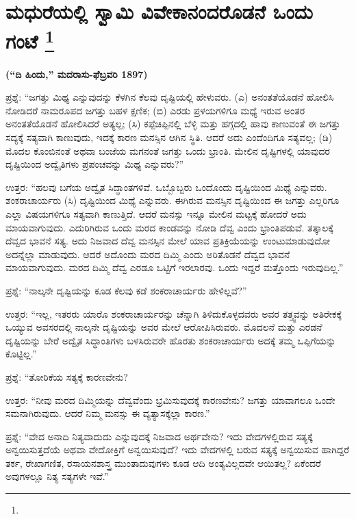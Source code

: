 
\chapter[ಮಧುರೆಯಲ್ಲಿ ಸ್ವಾಮಿ ವಿವೇಕಾನಂದರೊಡನೆ ಒಂದು ಗಂಟೆ ]{ಮಧುರೆಯಲ್ಲಿ ಸ್ವಾಮಿ ವಿವೇಕಾನಂದರೊಡನೆ ಒಂದು ಗಂಟೆ \protect\footnote{}}

\centerline{\textbf{(“ದಿ ಹಿಂದು,” ಮದರಾಸು-ಫೆಬ್ರವರಿ 1897)}}

ಪ್ರಶ್ನೆ: “ಜಗತ್ತು ಮಿಥ್ಯ ಎನ್ನುವುದನ್ನು ಕೆಳಗಿನ ಕೆಲವು ದೃಷ್ಟಿಯಲ್ಲಿ ಹೇಳುವರು. (ಎ) ಅನಂತತೆಯೊಡನೆ ಹೋಲಿಸಿ ನೋಡಿದರೆ ನಾಮರೂಪದ ಜಗತ್ತು ಬಹಳ ಕ್ಷಣಿಕ; (ಬಿ) ಎರಡು ಪ್ರಳಯಗಳಿಗೂ ಮಧ್ಯೆ ಇರುವ ಅಂತರ ಅನಂತತೆಯೊಡನೆ ಹೋಲಿಸಿದರೆ ಅತ್ಯಲ್ಪ; (ಸಿ) ಕಪ್ಪೆಚಿಪ್ಪಿನಲ್ಲಿ ಬೆಳ್ಳಿ ಮತ್ತು ಹಗ್ಗದಲ್ಲಿ ಹಾವು ಕಾಣುವಂತೆ ಈ ಜಗತ್ತು ಸದ್ಯಕ್ಕೆ ಸತ್ಯವಾಗಿ ಕಾಣುವುದು, ಇದಕ್ಕೆ ಕಾರಣ ಮನಸ್ಸಿನ ಆಗಿನ ಸ್ಥಿತಿ. ಆದರೆ ಅದು ಎಂದೆಂದಿಗೂ ಸತ್ಯವಲ್ಲ; (ಡಿ) ಮೊದಲ ಕೊಂಬಿನಂತೆ ಅಥವಾ ಬಂಜೆಯ ಮಗನಂತೆ ಜಗತ್ತು ಒಂದು ಭ್ರಾಂತಿ. ಮೇಲಿನ ದೃಷ್ಟಿಗಳಲ್ಲಿ ಯಾವುದರ ದೃಷ್ಟಿಯಿಂದ ಅದ್ವೈತಿಗಳು ಪ್ರಪಂಚವನ್ನು ಮಿಥ್ಯ ಎನ್ನುವರು?”

\vskip 3pt

ಉತ್ತರ: “ಹಲವು ಬಗೆಯ ಅದ್ವೈತ ಸಿದ್ಧಾಂತಗಳಿವೆ. ಒಬ್ಬೊಬ್ಬರು ಒಂದೊಂದು ದೃಷ್ಟಿಯಿಂದ ಮಿಥ್ಯೆ ಎನ್ನುವರು. ಶಂಕರಾಚಾರ್ಯರು (ಸಿ) ದೃಷ್ಟಿಯಿಂದ ಮಿಥ್ಯೆ ಎನ್ನುವರು. ಈಗಿರುವ ಮನಸ್ಸಿನ ದೃಷ್ಟಿಯಿಂದ ಈ ಜಗತ್ತು ಎಲ್ಲರಿಗೂ ಎಲ್ಲಾ ವಿಷಯಗಳಿಗೂ ಸತ್ಯವಾಗಿ ಕಾಣುತ್ತಿದೆ. ಆದರೆ ಮನಸ್ಸು ಇನ್ನೂ ಮೇಲಿನ ಮಟ್ಟಕ್ಕೆ ಹೋದರೆ ಅದು ಮಾಯವಾಗುವುದು. ಎದುರಿಗಿರುವ ಒಂದು ಮರದ ಕಾಂಡವನ್ನು ನೋಡಿ ದೆವ್ವ ಎಂದು ಭ್ರಾಂತಿಪಡುವೆ. ತತ್ಕಾಲಕ್ಕೆ ದೆವ್ವದ ಭಾವನೆ ಸತ್ಯ. ಅದು ನಿಜವಾದ ದೆವ್ವ ಮನಸ್ಸಿನ ಮೇಲೆ ಯಾವ ಪ್ರತಿಕ್ರಿಯೆಯನ್ನು ಉಂಟುಮಾಡುವುದೋ ಅದನ್ನೆಲ್ಲಾ ಮಾಡುವುದು. ಆದರೆ ಅದೊಂದು ಮರದ ದಿಮ್ಮಿ ಎಂದು ಅರಿತೊಡನೆ ದೆವ್ವದ ಭಾವನೆ ಮಾಯವಾಗುವುದು. ಮರದ ದಿಮ್ಮಿ ದೆವ್ವ ಎರಡೂ ಒಟ್ಟಿಗೆ ಇರಲಾರವು. ಒಂದು ಇದ್ದರೆ ಮತ್ತೊಂದು ಇರುವುದಿಲ್ಲ.”

\vskip 3pt

ಪ್ರಶ್ನೆ: “ನಾಲ್ಕನೇ ದೃಷ್ಟಿಯನ್ನು ಕೂಡ ಕೆಲವು ಕಡೆ ಶಂಕರಾಚಾರ್ಯರು ಹೇಳಿಲ್ಲವೆ?”

\vskip 3pt

ಉತ್ತರ: “ಇಲ್ಲ, ಇತರರು ಯಾರೊ ಶಂಕರಾಚಾರ್ಯರನ್ನು ಚೆನ್ನಾಗಿ ತಿಳಿದುಕೊಳ್ಳ\-ದವರು ಅವರ ತತ್ತ್ವವನ್ನು ಅತಿರೇಕಕ್ಕೆ ಒಯ್ಯುವ ಅವಸರದಲ್ಲಿ ನಾಲ್ಕನೇ ದೃಷ್ಟಿಯನ್ನು ಅವರ ಮೇಲೆ ಆರೋಪಿಸಿರುವರು. ಮೊದಲನೆ ಮತ್ತು ಎರಡನೆ ದೃಷ್ಟಿಯನ್ನು ಬೇರೆ ಅದ್ವೈತ ಸಿದ್ಧಾಂತಿಗಳು ಬಳಸಿರುವರೇ ಹೊರತು ಶಂಕರಾಚಾರ್ಯರು ಅದಕ್ಕೆ ತಮ್ಮ ಒಪ್ಪಿಗೆಯನ್ನು ಕೊಟ್ಟಿಲ್ಲ.”

\vskip 3pt

ಪ್ರಶ್ನೆ: “ತೋರಿಕೆಯ ಸತ್ಯಕ್ಕೆ ಕಾರಣವೇನು?

\vskip 3pt

ಉತ್ತರ: “ನೀವು ಮರದ ದಿಮ್ಮಿಯನ್ನು ದೆವ್ವವೆಂದು ಭ್ರಮಿಸುವುದಕ್ಕೆ ಕಾರಣವೇನು? ಜಗತ್ತು ಯಾವಾಗಲೂ ಒಂದೇ ಸಮನಾಗಿರುವುದು. ಆದರೆ ನಿಮ್ಮ ಮನಸ್ಸು ಈ ವ್ಯತ್ಯಾಸಕ್ಕೆಲ್ಲಾ ಕಾರಣ.”

\eject

ಪ್ರಶ್ನೆ: “ವೇದ ಅನಾದಿ ನಿತ್ಯವಾದುದು ಎನ್ನುವುದಕ್ಕೆ ನಿಜವಾದ ಅರ್ಥವೇನು? ಇದು ವೇದಗಳಲ್ಲಿರುವ ಸತ್ಯಕ್ಕೆ ಅನ್ವಯಿಸುತ್ತದೆಯೆ ಅಥವಾ ವೇದೋಕ್ತಿಗೆ ಅನ್ವಯಿಸುವುದೆ? ಇದು ವೇದಗಳಲ್ಲಿ ಬರುವ ಸತ್ಯಕ್ಕೆ ಅನ್ವಯಿಸುವ ಹಾಗಿದ್ದರೆ ತರ್ಕ, ರೇಖಾಗಣಿತ, ರಸಾಯನಶಾಸ್ತ್ರ ಮುಂತಾದುವುಗಳು ಕೂಡ ಆದಿ ಅಂತ್ಯವಿಲ್ಲದವೇ ಆಯಿತಲ್ಲ? ಏಕೆಂದರೆ ಅವುಗಳಲ್ಲೂ ನಿತ್ಯ ಸತ್ಯಗಳೇ ಇವೆ.”

